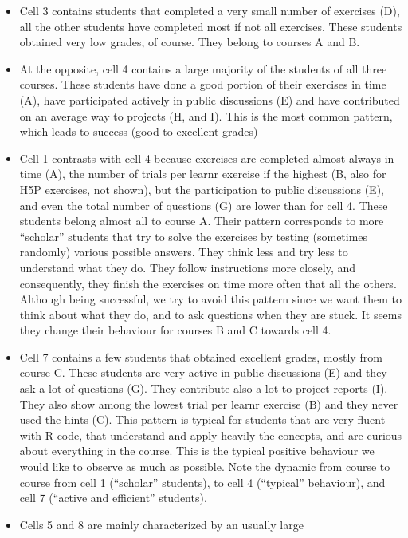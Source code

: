 \documentclass[
]{article}
\begin{document}
\begin{itemize}
\item
  Cell 3 contains students that completed a very small number of
  exercises (D), all the other students have completed most if not all
  exercises. These students obtained very low grades, of course. They
  belong to courses A and B.
\item
  At the opposite, cell 4 contains a large majority of the students of
  all three courses. These students have done a good portion of their
  exercises in time (A), have participated actively in public
  discussions (E) and have contributed on an average way to projects (H,
  and I). This is the most common pattern, which leads to success (good
  to excellent grades)
\item
  Cell 1 contrasts with cell 4 because exercises are completed almost
  always in time (A), the number of trials per learnr exercise if the
  highest (B, also for H5P exercises, not shown), but the participation
  to public discussions (E), and even the total number of questions (G)
  are lower than for cell 4. These students belong almost all to course
  A. Their pattern corresponds to more ``scholar'' students that try to
  solve the exercises by testing (sometimes randomly) various possible
  answers. They think less and try less to understand what they do. They
  follow instructions more closely, and consequently, they finish the
  exercises on time more often that all the others. Although being
  successful, we try to avoid this pattern since we want them to think
  about what they do, and to ask questions when they are stuck. It seems
  they change their behaviour for courses B and C towards cell 4.
\item
  Cell 7 contains a few students that obtained excellent grades, mostly
  from course C. These students are very active in public discussions
  (E) and they ask a lot of questions (G). They contribute also a lot to
  project reports (I). They also show among the lowest trial per learnr
  exercise (B) and they never used the hints (C). This pattern is
  typical for students that are very fluent with R code, that understand
  and apply heavily the concepts, and are curious about everything in
  the course. This is the typical positive behaviour we would like to
  observe as much as possible. Note the dynamic from course to course
  from cell 1 (``scholar'' students), to cell 4 (``typical'' behaviour),
  and cell 7 (``active and efficient'' students).
\item
  Cells 5 and 8 are mainly characterized by an usually large

\end{itemize}
\end{document}
